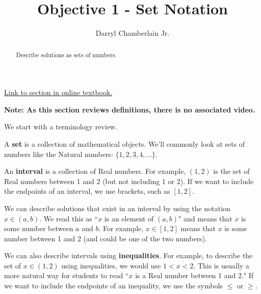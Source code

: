 \documentclass{ximera}
\author{Darryl Chamberlain Jr.}
\title{Objective 1 - Set Notation}
\begin{document}
\begin{abstract}
Describe solutions as sets of numbers. 
\end{abstract}
\maketitle

\href{https://cnx.org/contents/mwjClAV_@8.1:uIjtHMfW@9/Linear-Inequalities-and-Absolute-Value-Inequalities}{Link to section in online textbook.}

\textbf{\Large Note: As this section reviews definitions, there is no associated video.}


We start with a terminology review. 

A \textbf{set} is a collection of mathematical objects. We'll commonly look at sets of numbers like the Natural numbers: $\{ 1, 2, 3, 4, \ldots \}$. 

An \textbf{interval} is a collection of Real numbers. For example, $(1, 2)$ is the set of Real numbers between 1 and 2 (but not including 1 or 2). If we want to include the endpoints of an interval, we use brackets, such as $[1, 2]$. 

We can describe solutions that exist in an interval by using the notation $x \in (a, b)$. We read this as ``$x$ is an element of $(a, b)$" and means that $x$ is some number between $a$ and $b$. For example, $x \in [1, 2]$ means that $x$ is some number between 1 and 2 (and could be one of the two numbers). 

We can also describe intervals using \textbf{inequalities}. For example, to describe the set of $x \in (1, 2)$ using inequalities, we would use $1 < x < 2$. This is usually a more natural way for students to read ``$x$ is a Real number between 1 and 2." If we want to include the endpoints of an inequality, we use the symbols $\leq$ or $\geq$. 
\end{document}
